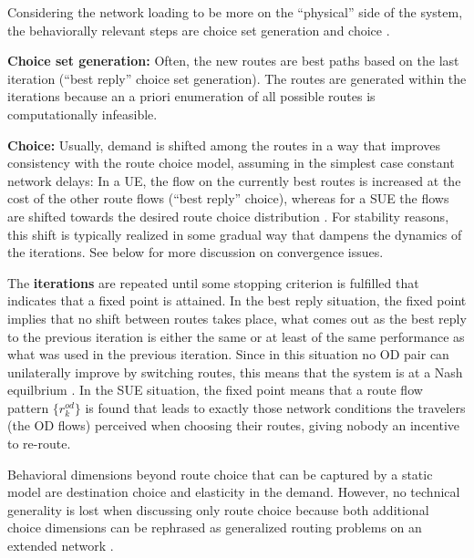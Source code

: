 Considering the network loading to be more on the ``physical'' side of the system, 
the behaviorally relevant steps are choice set generation and choice \citep{bowman-1998}.

\textbf{Choice set generation:} Often, the new routes are best paths
based on the last iteration (``best reply'' choice set generation).
The routes are generated within the iterations because an a priori
enumeration of all possible routes is computationally infeasible.

\textbf{Choice:} Usually, demand is shifted among the routes in a way
that improves consistency with the route choice model, assuming
in the simplest case
constant network delays: In a UE, the flow on the currently best routes
is increased at the cost of the other route flows (``best reply''
choice), whereas for a SUE the flows are shifted towards the desired
route choice distribution \citep[often a version of multinomial logit,
  e.g.,][]{dial-1971, cascetta-1996, ben-akiva-1999}. For
stability reasons, this shift is typically realized in some gradual
way that dampens the dynamics of the iterations. See below for more
discussion on convergence issues. 

The \textbf{iterations} are repeated until some stopping criterion is
fulfilled that indicates that a fixed point is attained.
In the best reply situation, the fixed point implies that no shift
between routes takes place, \ie what comes out as the best reply to
the previous iteration is either the same or at least of the same
performance as what was used in the previous iteration.
Since in this situation no OD pair can unilaterally improve
by switching routes, this means that the system is at a Nash
equilbrium \citep[e.g.,][]{HofbSigmBook}.
In the SUE situation, the fixed point means that a route flow pattern 
$\{r^{od}_k\}$ is found that leads to exactly those network conditions the
travelers (the OD flows) perceived when choosing their routes,
giving nobody an incentive to re-route.

Behavioral dimensions beyond route choice that can be captured by a
static model are destination choice and elasticity in the
demand. However, no technical generality is lost when discussing only
route choice because both additional choice dimensions can be
rephrased as generalized routing problems on an extended network
\citep[``supernetwork''; see, e.g.,][]{sheffi-1985,NagurneyEtcSupernetworks}. 


